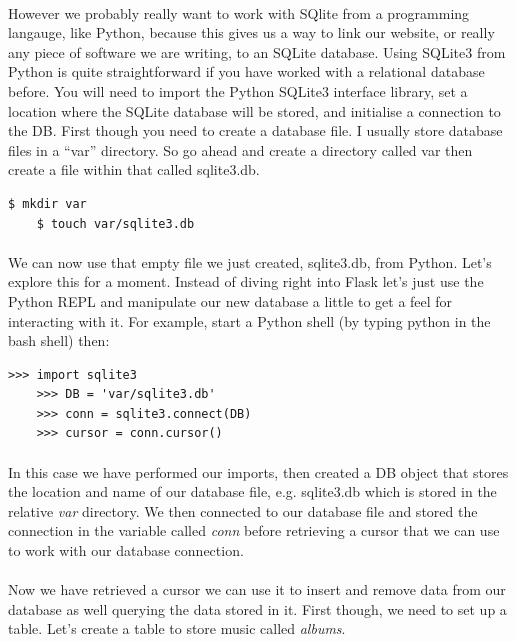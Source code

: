 \documentclass[12pt, a4paper, oneside]{book}
\begin{document}
\paragraph{} However we probably really want to work with SQlite from a programming langauge, like Python, because this gives us a way to link our website, or really any piece of software we are writing, to an SQLite database. Using SQLite3 from Python is quite straightforward if you have worked with a relational database before. You will need to import the Python SQLite3 interface library, set a location where the SQLite database will be stored, and initialise a connection to the DB. First though you need to create a database file. I usually store database files in a ``var'' directory. So go ahead and create a directory called var then create a file within that called sqlite3.db.

\begin{lstlisting}[style=DOS]
    $ mkdir var
    $ touch var/sqlite3.db
\end{lstlisting}


\paragraph{} We can now use that empty file we just created, sqlite3.db, from Python. Let's explore this for a moment. Instead of diving right into Flask let's just use the Python REPL and manipulate our new database a little to get a feel for interacting with it.  For example, start a Python shell (by typing python in the bash shell) then:

\begin{lstlisting}[style=DOS]
    >>> import sqlite3
    >>> DB = 'var/sqlite3.db'
    >>> conn = sqlite3.connect(DB)
    >>> cursor = conn.cursor()
\end{lstlisting}

\paragraph{} In this case we have performed our imports, then created a DB object that stores the location and name of our database file, e.g. sqlite3.db which is stored in the relative \emph{var} directory. We then connected to our database file and stored the connection in the variable called \emph{conn} before retrieving a cursor that we can use to work with our database connection.

\paragraph{} Now we have retrieved a cursor we can use it to insert and remove data from our database as well querying the data stored in it. First though, we need to set up a table. Let's create a table to store music called \emph{albums}.
\end{document}

